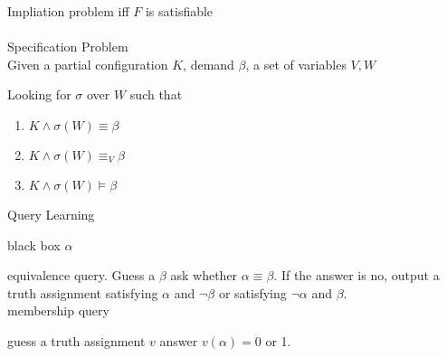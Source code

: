 \documentclass[12pt]{article}
\begin{document}
Impliation problem iff $F$ is satisfiable \\


\ \\


Specification Problem\\

Given a partial configuration $K$, demand $\beta$, a set of variables $V,W$

Looking for $\sigma$ over $W$ such that

\begin{enumerate}
\item $K\wedge \sigma(W)\equiv \beta$

\item $K\wedge\sigma(W) \equiv_V\beta$

\item $K\wedge\sigma(W)\models \beta$
\end{enumerate}


Query Learning 

black box $\alpha$   

equivalence query. Guess a $\beta$ ask whether $\alpha\equiv \beta$. If the answer is no, output a truth assignment satisfying $\alpha$ and $\neg \beta$ or satisfying $\neg\alpha$ and $\beta$.\\

membership query

guess a truth assignment $v$ answer $v(\alpha)=0$ or 1. 

 
\end{document}

